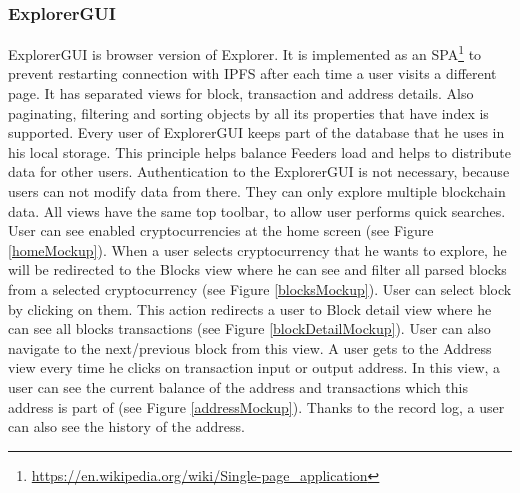 \subsubsection{ExplorerGUI}
ExplorerGUI is browser version of Explorer. It is implemented as an SPA\footnote{\url{https://en.wikipedia.org/wiki/Single-page_application}} to prevent restarting connection with IPFS after each time a user visits a different page. It has separated views for block, transaction and address details. Also paginating, filtering and sorting objects by all its properties that have index is supported. Every user of ExplorerGUI keeps part of the database that he uses in his local storage. This principle helps balance Feeders load and helps to distribute data for other users. Authentication to the ExplorerGUI is not necessary, because users can not modify data from there. They can only explore multiple blockchain data. All views have the same top toolbar, to allow user performs quick searches. User can see enabled cryptocurrencies at the home screen (see Figure \ref{homeMockup}). When a user selects cryptocurrency that he wants to explore, he will be redirected to the Blocks view where he can see and filter all parsed blocks from a selected cryptocurrency (see Figure \ref{blocksMockup}). User can select block by clicking on them. This action redirects a user to Block detail view where he can see all blocks transactions (see Figure \ref{blockDetailMockup}). User can also navigate to the next/previous block from this view. A user gets to the Address view every time he clicks on transaction input or output address. In this view, a user can see the current balance of the address and transactions which this address is part of (see Figure \ref{addressMockup}). Thanks to the record log, a user can also see the history of the address. 


